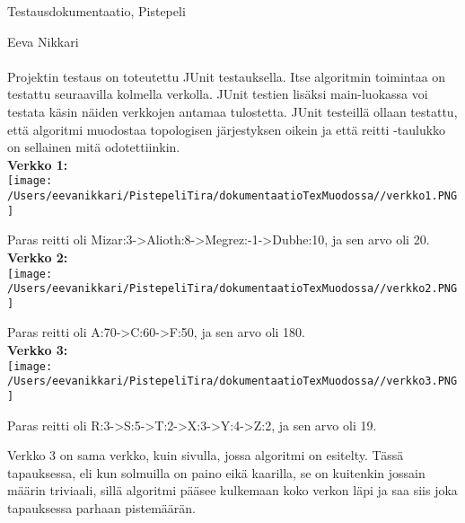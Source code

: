 \documentclass[12pt,a4paper,leqno]{amsart}
\begin{document}
Testausdokumentaatio, Pistepeli

Eeva Nikkari\\\\

Projektin testaus on toteutettu JUnit testauksella. Itse algoritmin toimintaa on testattu seuraavilla kolmella verkolla. JUnit testien lisäksi main-luokassa voi testata käsin näiden verkkojen antamaa tulostetta. JUnit testeillä ollaan testattu, että algoritmi muodostaa topologisen järjestyksen oikein ja että reitti -taulukko on sellainen mitä odotettiinkin.\\

\textbf{Verkko 1:}\\
\texttt{[image: /Users/eevanikkari/PistepeliTira/dokumentaatioTexMuodossa//verkko1.PNG]}

Paras reitti oli Mizar:3->Alioth:8->Megrez:-1->Dubhe:10, ja sen arvo oli 20.\\

\textbf{Verkko 2:}\\
\texttt{[image: /Users/eevanikkari/PistepeliTira/dokumentaatioTexMuodossa//verkko2.PNG]}

Paras reitti oli A:70->C:60->F:50, ja sen arvo oli 180.\\

\textbf{Verkko 3:}\\
\texttt{[image: /Users/eevanikkari/PistepeliTira/dokumentaatioTexMuodossa//verkko3.PNG]}

Paras reitti oli R:3->S:5->T:2->X:3->Y:4->Z:2, ja sen arvo oli 19.



Verkko 3 on sama verkko, kuin sivulla, jossa algoritmi on esitelty. Tässä tapauksessa, eli kun solmuilla on paino eikä kaarilla, se on kuitenkin jossain määrin triviaali, sillä algoritmi pääsee kulkemaan koko verkon läpi ja saa siis joka tapauksessa parhaan pistemäärän.
\end{document}
